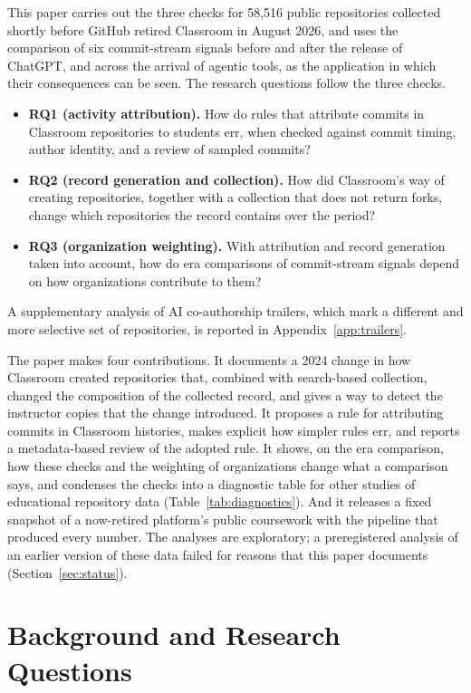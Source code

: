 \documentclass[acmsmall,screen,review,anonymous]{acmart}
\begin{document}
This paper carries out the three checks for 58,516 public repositories collected shortly before GitHub retired Classroom in August 2026, and uses the comparison of six commit-stream signals before and after the release of ChatGPT, and across the arrival of agentic tools, as the application in which their consequences can be seen. The research questions follow the three checks.

\begin{itemize}
\item \textbf{RQ1 (activity attribution).} How do rules that attribute commits in Classroom repositories to students err, when checked against commit timing, author identity, and a review of sampled commits?
\item \textbf{RQ2 (record generation and collection).} How did Classroom's way of creating repositories, together with a collection that does not return forks, change which repositories the record contains over the period?
\item \textbf{RQ3 (organization weighting).} With attribution and record generation taken into account, how do era comparisons of commit-stream signals depend on how organizations contribute to them?
\end{itemize}

\noindent A supplementary analysis of AI co-authorship trailers, which mark a different and more selective set of repositories, is reported in Appendix~\ref{app:trailers}.

The paper makes four contributions. It documents a 2024 change in how Classroom created repositories that, combined with search-based collection, changed the composition of the collected record, and gives a way to detect the instructor copies that the change introduced. It proposes a rule for attributing commits in Classroom histories, makes explicit how simpler rules err, and reports a metadata-based review of the adopted rule. It shows, on the era comparison, how these checks and the weighting of organizations change what a comparison says, and condenses the checks into a diagnostic table for other studies of educational repository data (Table~\ref{tab:diagnostics}). And it releases a fixed snapshot of a now-retired platform's public coursework with the pipeline that produced every number. The analyses are exploratory; a preregistered analysis of an earlier version of these data failed for reasons that this paper documents (Section~\ref{sec:status}).

\section{Background and Research Questions}
\label{sec:background}
\end{document}

